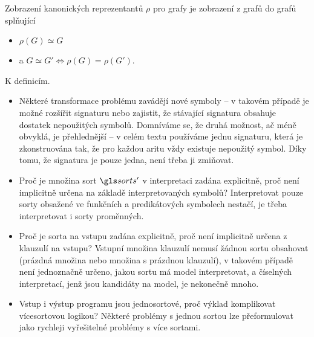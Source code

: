 Zobrazení kanonických reprezentantů $\rho$ pro grafy
je zobrazení z grafů do grafů splňující
\begin{itemize}
\item $\rho(G) \simeq G$
\item a $G \simeq G' \iff \rho(G) = \rho(G')$.
\end{itemize}


\begin{note}
K definicím.
\begin{itemize}
\item Některé transformace problému zavádějí nové symboly --
  v takovém případě je možné rozšířit signaturu nebo zajistit,
  že stávající signatura obsahuje dostatek nepoužitých symbolů. Domníváme se,
  že druhá možnost, ač méně obvyklá, je přehlednější --
  v celém textu používáme jednu signaturu, která je
  zkonstruována tak, že pro každou aritu vždy existuje
  nepoužitý symbol. Díky tomu, že signatura je pouze jedna,
  není třeba ji zmiňovat.
\item Proč je množina sort $\sorts'$ v interpretaci zadána explicitně, proč
  není implicitně určena na základě interpretovaných symbolů?
  Interpretovat pouze sorty obsažené ve funkčních a predikátových
  symbolech nestačí, je třeba interpretovat i sorty proměnných.
\item Proč je sorta na vstupu zadána explicitně, proč není implicitně určena
  z klauzulí na vstupu? Vstupní množina klauzulí nemusí žádnou sortu
  obsahovat (prázdná množina nebo množina s prázdnou klauzulí), v takovém
  případě není
  jednoznačně určeno, jakou sortu má model interpretovat, a číselných
  interpretací, jenž jsou kandidáty na model, je nekonečně mnoho.
\item Vstup i výstup programu jsou jednosortové, proč výklad komplikovat
  více\-sor\-tovou logikou? Některé problémy s jednou sortou
  lze přeformulovat jako rychleji vyřešitelné problémy s více sortami.
\end{itemize}
\end{note}
